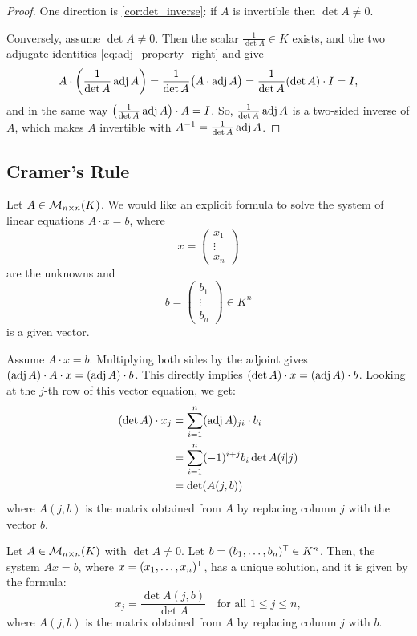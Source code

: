 \begin{proof}
One direction is \cref{cor:det_inverse}: if $A$ is invertible then $\det A \neq 0$.

Conversely, assume $\det A \neq 0$. Then the scalar $\frac{1}{\det A} \in K$ exists, and the two adjugate identities \eqref{eq:adj_property_right} and  give
\[
A \cdot \left( \frac{1}{\det A} \operatorname{adj} A \right) = \frac{1}{\det A} \big( A \cdot \operatorname{adj} A \big) = \frac{1}{\det A} (\det A) \cdot I = I,
\]
and in the same way $\left( \frac{1}{\det A} \operatorname{adj} A \right) \cdot A = I$. So, $\frac{1}{\det A} \operatorname{adj} A$ is a two-sided inverse of $A$, which makes $A$ invertible with $A^{-1} = \frac{1}{\det A} \operatorname{adj} A$.
\end{proof}


\subsection{Cramer's Rule}

Let $A \in \mathcal{M}_{n \times n}(K)$. We would like an explicit formula to solve the system of linear equations $A \cdot x = b$, where
\[
x = \begin{pmatrix} x_1 \\ \vdots \\ x_n \end{pmatrix}
\]
are the unknowns and
\[
b = \begin{pmatrix} b_1 \\ \vdots \\ b_n \end{pmatrix} \in K^n
\]
is a given vector.

Assume $A \cdot x = b$. Multiplying both sides by the adjoint gives $(\operatorname{adj} A) \cdot A \cdot x = (\operatorname{adj} A) \cdot b$. This directly implies $(\det A) \cdot x = (\operatorname{adj} A) \cdot b$.
Looking at the $j$-th row of this vector equation, we get:
\begin{align*}
  (\det A) \cdot x_j &= \sum_{i=1}^n (\operatorname{adj} A)_{ji} \cdot b_i \\
  &= \sum_{i=1}^n (-1)^{i+j} b_i \det A(i|j) \\
  &= \det(A(j, b))
\end{align*}
where $A(j, b)$ is the matrix obtained from $A$ by replacing column $j$ with the vector $b$.

\begin{theorem}
  \label{thm:cramers_rule}
  Let $A \in \mathcal{M}_{n \times n}(K)$ with $\det A \neq 0$. Let $b = (b_1, \dots, b_n)^{\mathsf{T}} \in K^n$. Then, the system $A x = b$, where $x = (x_1, \dots, x_n)^{\mathsf{T}}$, has a unique solution, and it is given by the formula:
  \[
  x_j = \frac{\det A(j, b)}{\det A} \quad \text{for all } 1 \le j \le n,
  \]
  where $A(j,b)$ is the matrix obtained from $A$ by replacing column $j$ with $b$.
\end{theorem}

